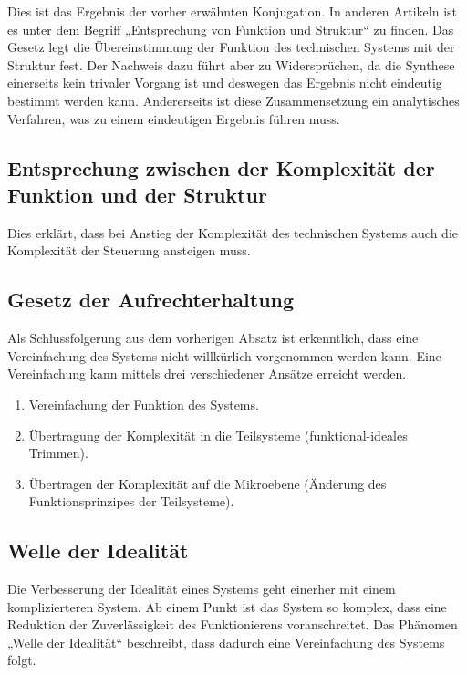 \documentclass[11pt,a4paper]{article}
\begin{document}
Dies ist das Ergebnis der vorher erwähnten Konjugation.  In anderen Artikeln
ist es unter dem Begriff „Entsprechung von Funktion und Struktur“ zu finden.
Das Gesetz legt die Übereinstimmung der Funktion des technischen Systems mit
der Struktur fest.  Der Nachweis dazu führt aber zu Widersprüchen, da die
Synthese einerseits kein trivaler Vorgang ist und deswegen das Ergebnis nicht
eindeutig bestimmt werden kann.  Andererseits ist diese Zusammensetzung ein
analytisches Verfahren, was zu einem eindeutigen Ergebnis führen muss.

\subsection{Entsprechung zwischen der Komplexität der Funktion und der
  Struktur}

Dies erklärt, dass bei Anstieg der Komplexität des technischen Systems auch
die Komplexität der Steuerung ansteigen muss.

\subsection{Gesetz der Aufrechterhaltung}

Als Schlussfolgerung aus dem vorherigen Absatz ist erkenntlich, dass eine
Vereinfachung des Systems nicht willkürlich vorgenommen werden kann.  Eine
Vereinfachung kann mittels drei verschiedener Ansätze erreicht werden.

\begin{enumerate}[noitemsep]
\item Vereinfachung der Funktion des Systems.
\item Übertragung der Komplexität in die Teilsysteme (funktional-ideales
  Trimmen).
\item Übertragen der Komplexität auf die Mikroebene (Änderung des
  Funktionsprinzipes der Teilsysteme).
\end{enumerate}

\subsection{Welle der Idealität}

Die Verbesserung der Idealität eines Systems geht einerher mit einem
komplizierteren System.  Ab einem Punkt ist das System so komplex, dass eine
Reduktion der Zuverlässigkeit des Funktionierens voranschreitet.  Das Phänomen
„Welle der Idealität“ beschreibt, dass dadurch eine Vereinfachung des Systems
folgt.
\end{document}
